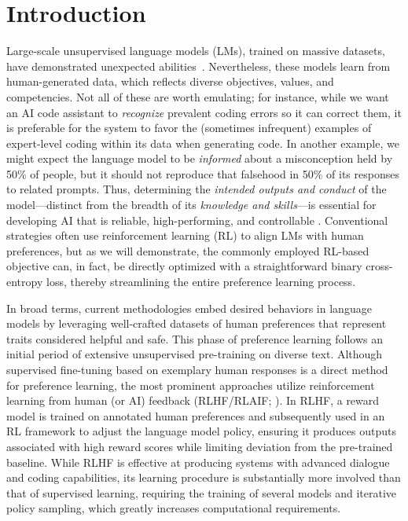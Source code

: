 \section{Introduction}
Large-scale unsupervised language models (LMs), trained on massive datasets, have demonstrated unexpected abilities~\citep{chowdhery2022palm, brown2020language, touvron2023llama,bubeck2023sparks}. Nevertheless, these models learn from human-generated data, which reflects diverse objectives, values, and competencies. Not all of these are worth emulating; for instance, while we want an AI code assistant to \textit{recognize} prevalent coding errors so it can correct them, it is preferable for the system to favor the (sometimes infrequent) examples of expert-level coding within its data when generating code. In another example, we might expect the language model to be \textit{informed} about a misconception held by 50\% of people, but it should not reproduce that falsehood in 50\% of its responses to related prompts. Thus, determining the \emph{intended outputs and conduct} of the model—distinct from the breadth of its \textit{knowledge and skills}—is essential for developing AI that is reliable, high-performing, and controllable \citep{ouyang2022training}. Conventional strategies often use reinforcement learning (RL) to align LMs with human preferences, but as we will demonstrate, the commonly employed RL-based objective can, in fact, be directly optimized with a straightforward binary cross-entropy loss, thereby streamlining the entire preference learning process.

In broad terms, current methodologies embed desired behaviors in language models by leveraging well-crafted datasets of human preferences that represent traits considered helpful and safe. This phase of preference learning follows an initial period of extensive unsupervised pre-training on diverse text. Although supervised fine-tuning based on exemplary human responses is a direct method for preference learning, the most prominent approaches utilize reinforcement learning from human (or AI) feedback (RLHF/RLAIF; \citep{christiano2017deep,bai2022constitutional}). In RLHF, a reward model is trained on annotated human preferences and subsequently used in an RL framework to adjust the language model policy, ensuring it produces outputs associated with high reward scores while limiting deviation from the pre-trained baseline. While RLHF is effective at producing systems with advanced dialogue and coding capabilities, its learning procedure is substantially more involved than that of supervised learning, requiring the training of several models and iterative policy sampling, which greatly increases computational requirements.

